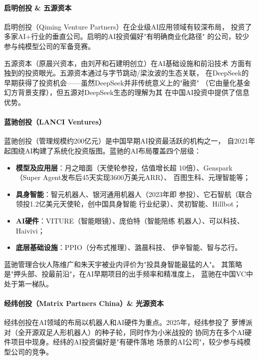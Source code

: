 \paragraph{启明创投 \& 五源资本}

启明创投（Qiming Venture Partners）在企业级AI应用领域有较深布局，
投资了多家AI+行业的垂直公司。启明的AI投资偏好"有明确商业化路径"
的公司，较少参与纯模型公司的军备竞赛。

五源资本（原晨兴资本，由刘芹和石建明创立）在AI基础设施和前沿技术
方面有独到的投资眼光。五源资本通过与字节跳动/梁汝波的生态关联，
在DeepSeek的早期获得了投资机会——虽然DeepSeek并非传统意义上的"融资"
（它由量化基金幻方背景支撑），但五源对DeepSeek生态的理解为其
在中国AI投资中提供了信息优势。

\paragraph{蓝驰创投（LANCI Ventures）}

蓝驰创投（管理规模约200亿元）是中国早期AI投资最活跃的机构之一，
自2021年起围绕AI构建了系统化投资版图。蓝驰的AI布局覆盖四个层级：
\begin{itemize}
  \item \textbf{模型及应用层}：月之暗面（天使轮参投，估值增长超
    10倍）、Genspark（Super Agent发布后45天实现3600万美元ARR）、
    百图生科、元理智能等；
  \item \textbf{具身智能}：智元机器人、银河通用机器人（2023年即
    参投）、它石智航（联合领投1.2亿美元天使轮，创中国具身智能
    行业纪录）、灵初智能、Hillbot；
  \item \textbf{AI硬件}：VITURE（智能眼镜）、庞伯特（智能陪练
    机器人）、可以科技、Haivivi；
  \item \textbf{底层基础设施}：PPIO（分布式推理）、潞晨科技、
    伊辛智能、智与芯行。
\end{itemize}

蓝驰管理合伙人陈维广和朱天宇被业内评价为"投具身智能最猛的人"。
其策略是"押头部、投最前沿"，在AI早期项目的出手频率和精准度上，
蓝驰在中国VC中处于第一梯队。

\paragraph{经纬创投（Matrix Partners China）\& 光源资本}

经纬创投在AI领域的布局以机器人和AI硬件为重点。2025年，经纬参投了
萝博派对（全开源双足人形机器人）的种子轮，同时作为小米战投的
协同方在多个AI硬件项目中现身。经纬的AI投资偏好是"有硬件落地
场景的AI公司"，较少参与纯模型公司的竞争。


